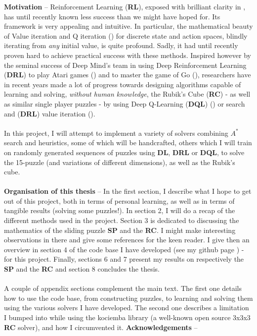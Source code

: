 
\label{Abstract}
\noindent \textbf{Motivation} -- Reinforcement Learning (\textbf{RL}), exposed with brilliant clarity in \cite{Sutton1998}, has until recently known less success than we might have hoped for. Its framework is very appealing and intuitive. In particular, the mathematical beauty of Value iteration and Q iteration (\cite{WatkinsThesis}) for discrete state and action spaces, blindly iterating from \textit{any} initial value, is quite profound. Sadly, it had until recently proven hard to achieve practical success with these methods. Inspired however by the seminal success of Deep Mind's team in using Deep Reinforcement Learning (\textbf{DRL}) to play Atari games (\cite{Mnih2013})  and to master the game of Go (\cite{AlphaGo}), researchers have in recent years made a lot of progress towards designing algorithms capable of learning and solving, \textit{without human knowledge}, the Rubik's Cube (\textbf{RC}) - as well as similar single player puzzles - by using Deep Q-Learning (\textbf{DQL})  (\cite{DBLP:journals/corr/abs-1805-07470}) or search and (\textbf{DRL}) value iteration (\cite{https://doi.org/10.48550/arxiv.1805.07470}).
\\
\\
In this project, I will attempt to implement a variety of solvers combining $A^{*}$ search and heuristics, some of which will be handcrafted, others which I will train on randomly generated sequences of puzzles using \textbf{DL}, \textbf{DRL} or \textbf{DQL}, to solve the 15-puzzle (and variations of different dimensions), as well as the Rubik's cube.
\\
\\
\textbf{Organisation of this thesis} -- In the first section, I describe what I hope to get out of this project, both in terms of personal learning, as well as in terms of tangible results (solving some puzzles!). In section 2, I will do a recap of the different methods used in the project. Section 3 is dedicated to discussing the mathematics of the sliding puzzle \textbf{SP} and the \textbf{RC}. I might make interesting observations in there and give some references for the keen reader. I give then an overview in section 4 of the code base I have developed (see my github page \cite{FB}) - for this project. Finally, sections 6 and 7 present my results on respectively the \textbf{SP} and the \textbf{RC} and section 8 concludes the thesis.
\\
\\
A couple of appendix sections complement the main text. The first one details how to use the code base, from constructing puzzles, to learning and solving them using the various solvers I have developed. The second one describes a limitation I bumped into while using the kociemba library (a well-known open source 3x3x3 \textbf{RC} solver), and how I circumvented it.
\newpage
\thispagestyle{empty}
\noindent \textbf{Acknowledgements} -- 
